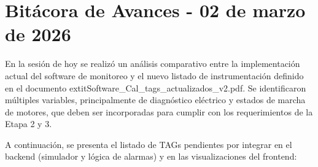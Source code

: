 \section{Bitácora de Avances - 02 de marzo de 2026}

En la sesión de hoy se realizó un análisis comparativo entre la implementación actual del software de monitoreo y el nuevo listado de instrumentación definido en el documento 	extit{Software\_Cal\_tags\_actualizados\_v2.pdf}. Se identificaron múltiples variables, principalmente de diagnóstico eléctrico y estados de marcha de motores, que deben ser incorporadas para cumplir con los requerimientos de la Etapa 2 y 3.

A continuación, se presenta el listado de TAGs pendientes por integrar en el backend (simulador y lógica de alarmas) y en las visualizaciones del frontend:

